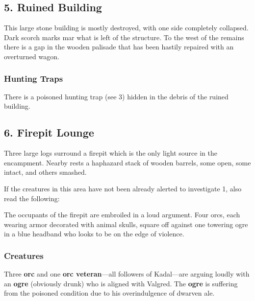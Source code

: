 \documentclass[10pt,a4paper,twoside,bg=print,twocolumn,openany,nodeprecatedcode]{dndbook}
\begin{document}
\subsection{5. Ruined Building}
\begin{DndReadAloud}{}
This large stone building is mostly destroyed, with one side completely collapsed. Dark scorch marks mar what is left of the structure. To the west of the remains there is a gap in the wooden palisade that has been hastily repaired with an overturned wagon.

\end{DndReadAloud}

\subsubsection{Hunting Traps}
There is a poisoned hunting trap (see 3) hidden in the debris of the ruined building.

\subsection{6. Firepit Lounge}
\begin{DndReadAloud}{}
Three large logs surround a firepit which is the only light source in the encampment. Nearby rests a haphazard stack of wooden barrels, some open, some intact, and others smashed.

\end{DndReadAloud}

If the creatures in this area have not been already alerted to investigate 1, also read the following:

\begin{DndReadAloud}{}
The occupants of the firepit are embroiled in a loud argument. Four orcs, each wearing armor decorated with animal skulls, square off against one towering ogre in a blue headband who looks to be on the edge of violence.

\end{DndReadAloud}

\subsubsection{Creatures}
Three \textbf{orc} and one \textbf{orc veteran}—all followers of Kadal—are arguing loudly with an \textbf{ogre} (obviously drunk) who is aligned with Valgred. The \textbf{ogre} is suffering from the poisoned condition due to his overindulgence of dwarven ale.
\end{document}
